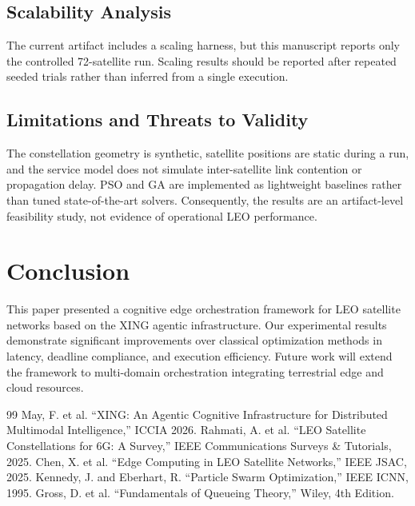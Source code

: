 \documentclass[sigconf]{acmart}
\begin{document}
\subsection{Scalability Analysis}

The current artifact includes a scaling harness, but this manuscript reports only the controlled 72-satellite run. Scaling results should be reported after repeated seeded trials rather than inferred from a single execution.

\subsection{Limitations and Threats to Validity}

The constellation geometry is synthetic, satellite positions are static during a run, and the service model does not simulate inter-satellite link contention or propagation delay. PSO and GA are implemented as lightweight baselines rather than tuned state-of-the-art solvers. Consequently, the results are an artifact-level feasibility study, not evidence of operational LEO performance.

\section{Conclusion}

This paper presented a cognitive edge orchestration framework for LEO satellite networks based on the XING agentic infrastructure. Our experimental results demonstrate significant improvements over classical optimization methods in latency, deadline compliance, and execution efficiency. Future work will extend the framework to multi-domain orchestration integrating terrestrial edge and cloud resources.


\begin{thebibliography}{99}
 May, F. et al. ``XING: An Agentic Cognitive Infrastructure for Distributed Multimodal Intelligence,'' ICCIA 2026.
 Rahmati, A. et al. ``LEO Satellite Constellations for 6G: A Survey,'' IEEE Communications Surveys \& Tutorials, 2025.
 Chen, X. et al. ``Edge Computing in LEO Satellite Networks,'' IEEE JSAC, 2025.
 Kennedy, J. and Eberhart, R. ``Particle Swarm Optimization,'' IEEE ICNN, 1995.
 Gross, D. et al. ``Fundamentals of Queueing Theory,'' Wiley, 4th Edition.
\end{thebibliography}
\end{document}

